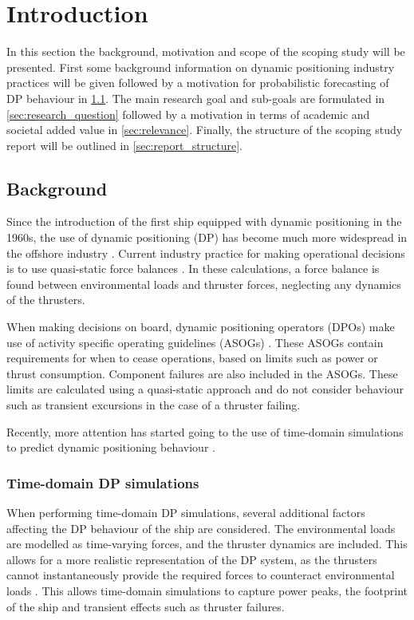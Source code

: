 \chapter{Introduction}
In this section the background, motivation and scope of the scoping study will be presented. First some background
information on dynamic positioning industry practices will be given followed by
a motivation for probabilistic forecasting of DP behaviour in \cref{sec:background}. The main research goal and
sub-goals are formulated in \cref{sec:research_question} followed by a motivation in terms of academic and societal
added value in \cref{sec:relevance}. Finally, the structure of the scoping
study report will be outlined in \cref{sec:report_structure}.


\section{Background}
\label{sec:background}
Since the introduction of the first ship equipped with dynamic positioning in the 1960s, the use of dynamic positioning
(DP) has become much more widespread in the offshore industry \parencite{HistoryDP2017}. Current industry practice for
making operational decisions is to use quasi-static force balances \parencites
{RecommendedPracticeSpecification2025}{AssessmentStationKeeping2021}. In these calculations, a force balance is found
between environmental loads and thruster forces, neglecting any dynamics of the thrusters. 

When making decisions on board, dynamic positioning operators (DPOs) make use of activity specific operating guidelines
(ASOGs) \parencites{ASOGDecisionSupport2022}{baillyguimaeraesCAMOASOGNaval2023}. These ASOGs contain requirements for
when to cease operations, based on limits such as power or thrust consumption. Component failures are also included in
the ASOGs. These limits are calculated using a quasi-static approach
and do not consider behaviour such as transient excursions in the case of a thruster failing.

Recently, more attention has started going to the use of time-domain simulations to predict dynamic positioning
behaviour \parencites{RecommendedPracticeSpecification2025}{AssessmentStationKeeping2021}.

\subsection{Time-domain DP simulations}
\label{subsec:time_domain_simulations}
When performing time-domain DP simulations, several additional factors affecting the DP behaviour of the ship are
considered. The environmental loads are modelled as time-varying forces, and the thruster dynamics are included. This
allows for a more realistic representation of the DP system, as the thrusters cannot instantaneously provide the
required forces to counteract environmental loads \parencite{armaogluAdvantagesUsingTimeDomain2014}. This allows
time-domain simulations to capture power peaks, the footprint of the ship and transient effects such as thruster failures.

